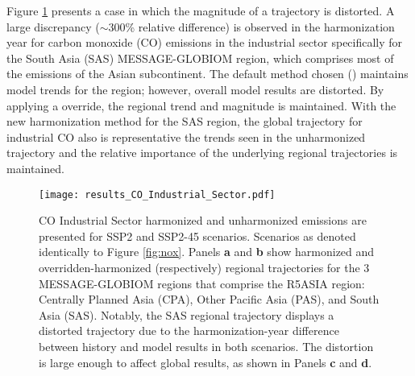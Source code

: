 Figure \ref{fig:co} presents a case in which the magnitude of a trajectory is
distorted. A large discrepancy ($\sim$300\% relative difference) is observed in
the harmonization year for carbon monoxide (CO) emissions in the industrial
sector specifically for the South Asia (SAS) MESSAGE-GLOBIOM region, which
comprises most of the emissions of the Asian subcontinent. The default method
chosen () maintains model trends for the region; however,
overall model results are distorted. By applying a 
override, the regional trend and magnitude is maintained. With the new
harmonization method for the SAS region, the global trajectory for industrial CO
also is representative the trends seen in the unharmonized trajectory and the
relative importance of the underlying regional trajectories is maintained.

\begin{figure}
  \begin{center}
    \texttt{[image: results\_CO\_Industrial\_Sector.pdf]}
    \caption[]{
      \label{fig:co}
      CO Industrial Sector harmonized and unharmonized emissions are presented
      for SSP2 and SSP2-45 scenarios. Scenarios as denoted identically to Figure
      \ref{fig:nox}. Panels \textbf{a} and \textbf{b} show harmonized and
      overridden-harmonized (respectively) regional trajectories for the 3
      MESSAGE-GLOBIOM regions that comprise the R5ASIA region: Centrally Planned
      Asia (CPA), Other Pacific Asia (PAS), and South Asia (SAS). Notably, the
      SAS regional trajectory displays a distorted trajectory due to the
      harmonization-year difference between history and model results in both
      scenarios. The distortion is large enough to affect global results, as
      shown in Panels \textbf{c} and \textbf{d}.  
}
  \end{center}
\end{figure}

